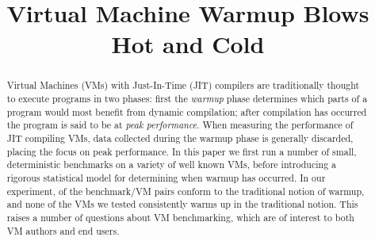 \documentclass[preprint,numbers,10pt]{sigplanconf}
\begin{document}
\title{Virtual Machine Warmup Blows Hot and Cold}



\maketitle



\begin{abstract}
Virtual Machines (VMs) with Just-In-Time (JIT) compilers are traditionally thought
to execute programs in two phases: first the \emph{warmup} phase determines which
parts of a program would most benefit from dynamic compilation; after
compilation has occurred the program is said to be at \emph{peak performance}.
When measuring the performance of JIT compiling VMs, data collected
during the warmup phase is generally discarded, placing the focus on peak
performance. In this paper we first run a number of small,
deterministic benchmarks on a variety of well known VMs, before introducing
a rigorous statistical model for determining when warmup has occurred.
In our experiment,  of the benchmark/VM pairs conform to
the traditional notion of warmup, and none of the
VMs we tested consistently warms up in the traditional notion. This raises
a number of questions about VM benchmarking, which are of interest to
both VM authors and end users.
\end{abstract}
\end{document}
